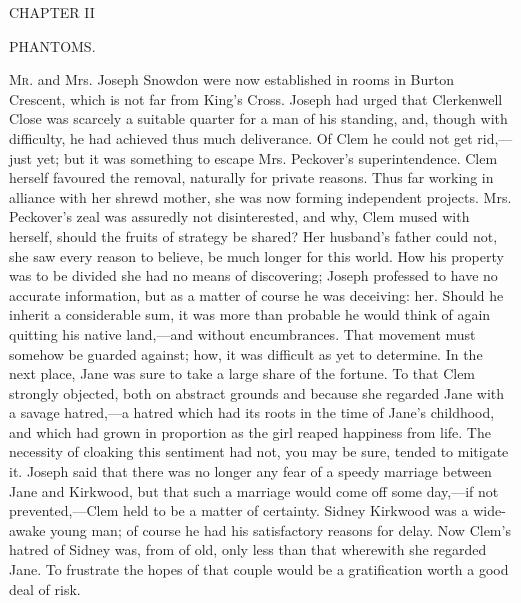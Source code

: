 {}

{CHAPTER II}

PHANTOMS.

\textsc{Mr.} and Mrs. Joseph Snowdon were now established in rooms in
Burton Crescent, which is not far from King's Cross. Joseph had urged
that Clerkenwell Close was scarcely a suitable quarter for a man of his
standing, and, though with difficulty, he had achieved thus much
deliverance. Of Clem he could not get rid,---just yet; but it was
something to escape Mrs. Peckover's superintendence. Clem herself
favoured the removal, naturally for private reasons. Thus far working in
alliance with her shrewd mother, she was now forming independent
projects. Mrs. Peckover's zeal was assuredly not disinterested, and why,
Clem mused with herself, should the fruits of strategy be shared? Her
husband's father could not, she saw every reason to believe, be much
longer for this world. How his property {}was to be divided she had no
means of discovering; Joseph professed to have no accurate information,
but as a matter of course he was deceiving: her. Should he inherit a
considerable sum, it was more than probable he would think of again
quitting his native land,---and without encumbrances. That movement must
somehow be guarded against; how, it was difficult as yet to determine.
In the next place, Jane was sure to take a large share of the fortune.
To that Clem strongly objected, both on abstract grounds and because she
regarded Jane with a savage hatred,---a hatred which had its roots in
the time of Jane's childhood, and which had grown in proportion as the
girl reaped happiness from life. The necessity of cloaking this
sentiment had not, you may be sure, tended to mitigate it. Joseph said
that there was no longer any fear of a speedy marriage between Jane and
Kirkwood, but that such a marriage would come off some day,---if not
prevented,---Clem held to be a matter of certainty. Sidney Kirkwood was
a wide-awake young man; of course he had his satisfactory reasons for
delay. Now Clem's hatred of Sidney was, from of old, only less than that
{}wherewith she regarded Jane. To frustrate the hopes of that couple
would be a gratification worth a good deal of risk.

